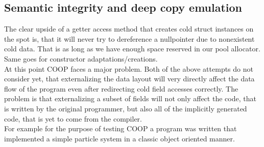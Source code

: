 \subsection{Semantic integrity and deep copy emulation}\label{deep_copy_emulation}
The clear upside of a getter access method that creates cold struct instances on the spot is, that it will never try to dereference a nullpointer due to nonexistent cold data. That is as long as we have enough space reserved in our pool allocator. Same goes for constructor adaptations/creations.\\
At this point COOP faces a major problem. Both of the above attempts do not consider yet, that externalizing the data layout will very directly affect the data flow of the program even after redirecting cold field accesses correctly. The problem is that externalizing a subset of fields will not only affect the code, that is written by the original programmer, but also all of the implicitly generated code, that is yet to come from the compiler.\\
For example for the purpose of testing COOP a program was written that implemented a simple particle system in a classic object oriented manner.
